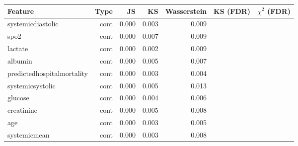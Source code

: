 \begin{tabular}{lrrrrrr}
\toprule
Feature & Type & JS & KS & Wasserstein & KS (FDR) & $\chi^2$ (FDR) \\
\midrule
systemicdiastolic & cont & 0.000 & 0.003 & 0.009 &  &  \\
spo2 & cont & 0.000 & 0.007 & 0.009 &  &  \\
lactate & cont & 0.000 & 0.002 & 0.009 &  &  \\
albumin & cont & 0.000 & 0.005 & 0.007 &  &  \\
predictedhospitalmortality & cont & 0.000 & 0.003 & 0.004 &  &  \\
systemicsystolic & cont & 0.000 & 0.005 & 0.013 &  &  \\
glucose & cont & 0.000 & 0.004 & 0.006 &  &  \\
creatinine & cont & 0.000 & 0.005 & 0.008 &  &  \\
age & cont & 0.000 & 0.003 & 0.005 &  &  \\
systemicmean & cont & 0.000 & 0.003 & 0.008 &  &  \\
\bottomrule
\end{tabular}
